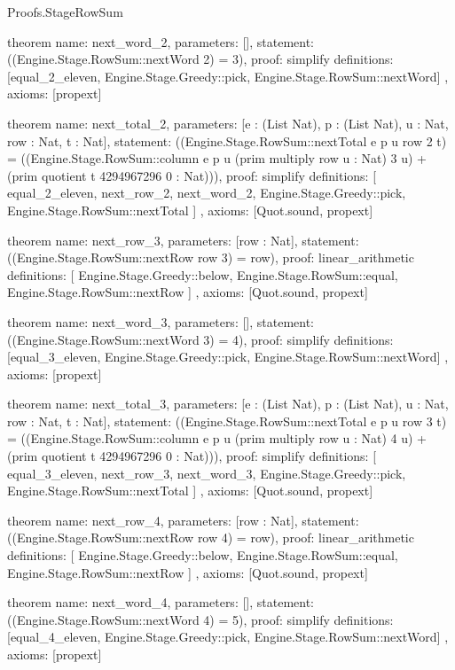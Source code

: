 \begin{lexlean}{Proofs.StageRowSum}
\begin{semanticmodule}
theorem{
  name: next_word_2,
  parameters: [],
  statement: ((Engine.Stage.RowSum::nextWord 2) = 3),
  proof: simplify{
    definitions: [equal_2_eleven, Engine.Stage.Greedy::pick, Engine.Stage.RowSum::nextWord]
  },
  axioms: [propext]
}

theorem{
  name: next_total_2,
  parameters: [e : (List Nat), p : (List Nat), u : Nat, row : Nat, t : Nat],
  statement: ((Engine.Stage.RowSum::nextTotal e p u row 2 t) = ((Engine.Stage.RowSum::column e p u (prim multiply row u : Nat) 3 u) + (prim quotient t 4294967296 0 : Nat))),
  proof: simplify{
    definitions: [
      equal_2_eleven,
      next_row_2,
      next_word_2,
      Engine.Stage.Greedy::pick,
      Engine.Stage.RowSum::nextTotal
    ]
  },
  axioms: [Quot.sound, propext]
}

theorem{
  name: next_row_3,
  parameters: [row : Nat],
  statement: ((Engine.Stage.RowSum::nextRow row 3) = row),
  proof: linear_arithmetic{
    definitions: [
      Engine.Stage.Greedy::below,
      Engine.Stage.RowSum::equal,
      Engine.Stage.RowSum::nextRow
    ]
  },
  axioms: [Quot.sound, propext]
}

theorem{
  name: next_word_3,
  parameters: [],
  statement: ((Engine.Stage.RowSum::nextWord 3) = 4),
  proof: simplify{
    definitions: [equal_3_eleven, Engine.Stage.Greedy::pick, Engine.Stage.RowSum::nextWord]
  },
  axioms: [propext]
}

theorem{
  name: next_total_3,
  parameters: [e : (List Nat), p : (List Nat), u : Nat, row : Nat, t : Nat],
  statement: ((Engine.Stage.RowSum::nextTotal e p u row 3 t) = ((Engine.Stage.RowSum::column e p u (prim multiply row u : Nat) 4 u) + (prim quotient t 4294967296 0 : Nat))),
  proof: simplify{
    definitions: [
      equal_3_eleven,
      next_row_3,
      next_word_3,
      Engine.Stage.Greedy::pick,
      Engine.Stage.RowSum::nextTotal
    ]
  },
  axioms: [Quot.sound, propext]
}

theorem{
  name: next_row_4,
  parameters: [row : Nat],
  statement: ((Engine.Stage.RowSum::nextRow row 4) = row),
  proof: linear_arithmetic{
    definitions: [
      Engine.Stage.Greedy::below,
      Engine.Stage.RowSum::equal,
      Engine.Stage.RowSum::nextRow
    ]
  },
  axioms: [Quot.sound, propext]
}

theorem{
  name: next_word_4,
  parameters: [],
  statement: ((Engine.Stage.RowSum::nextWord 4) = 5),
  proof: simplify{
    definitions: [equal_4_eleven, Engine.Stage.Greedy::pick, Engine.Stage.RowSum::nextWord]
  },
  axioms: [propext]
}


\end{semanticmodule}
\end{lexlean}
